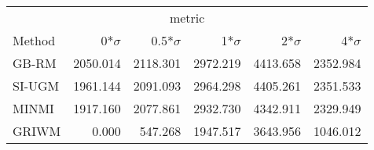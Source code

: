 
\begin{tabular}{lrrrrr}
\toprule
\multicolumn{1}{c}{ } & \multicolumn{4}{c}{metric} \\
\cmidrule(l{3pt}r{3pt}){2-5}
Method & 0*$\sigma$ & 0.5*$\sigma$ & 1*$\sigma$ & 2*$\sigma$ & 4*$\sigma$\\
\midrule
GB-RM & 2050.014 & 2118.301 & 2972.219 & 4413.658 & 2352.984\\
SI-UGM & 1961.144 & 2091.093 & 2964.298 & 4405.261 & 2351.533\\
MINMI & 1917.160 & 2077.861 & 2932.730 & 4342.911 & 2329.949\\
GRIWM & 0.000 & 547.268 & 1947.517 & 3643.956 & 1046.012\\
\bottomrule
\end{tabular}
